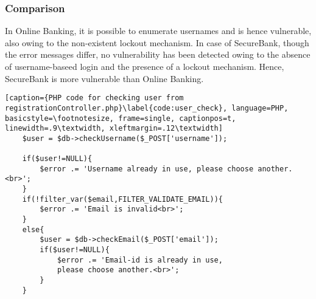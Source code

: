\subsubsection{Comparison}
In Online Banking, it is possible to enumerate usernames and is hence vulnerable, also owing to the non-existent lockout mechanism.
In case of SecureBank, though the error messages differ, no vulnerability has been detected owing to the absence of username-baseed login and the presence of a lockout mechanism.
Hence, SecureBank is more vulnerable than Online Banking.
\clearpage

\begin{lstlisting}[caption={PHP code for checking user from registrationController.php}\label{code:user_check}, language=PHP, basicstyle=\footnotesize, frame=single, captionpos=t, linewidth=.9\textwidth, xleftmargin=.12\textwidth]
	$user = $db->checkUsername($_POST['username']);

	if($user!=NULL){
		$error .= 'Username already in use, please choose another.<br>';
	}
	if(!filter_var($email,FILTER_VALIDATE_EMAIL)){
		$error .= 'Email is invalid<br>';
	}
	else{
		$user = $db->checkEmail($_POST['email']);
		if($user!=NULL){
			$error .= 'Email-id is already in use,
			please choose another.<br>';
		}
	}
\end{lstlisting}